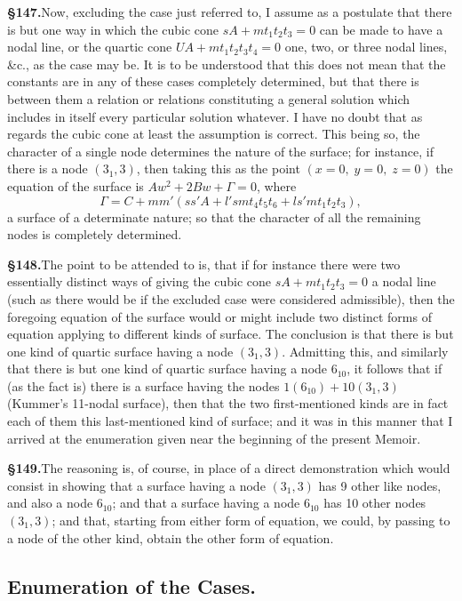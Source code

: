 \documentclass[11pt,a4paper]{article}
\begin{document}
\textbf{\S 147.}\quad Now, excluding the case just referred to, I assume as a postulate that there is but one way in which the cubic cone $sA + mt_1t_2t_3 = 0$ can be made to have a nodal line, or the quartic cone $UA + mt_1t_2t_3t_4 = 0$ one, two, or three nodal lines, \&c., as the case may be. It is to be understood that this does not mean that the constants are in any of these cases completely determined, but that there is between them a relation or relations constituting a general solution which includes in itself every particular solution whatever. I have no doubt that as regards the cubic cone at least the assumption is correct. This being so, the character of a single node determines the nature of the surface; for instance, if there is a node $(3_1, 3)$, then taking this as the point $(x = 0,\; y = 0,\; z = 0)$ the equation of the surface is $Aw^2 + 2Bw + \Gamma = 0$, where
\[
\Gamma = C + mm'(ss'A + l'smt_4t_5t_6 + ls'mt_1t_2t_3),
\]
a surface of a determinate nature; so that the character of all the remaining nodes is completely determined.

\textbf{\S 148.}\quad The point to be attended to is, that if for instance there were two essentially distinct ways of giving the cubic cone $sA + mt_1t_2t_3 = 0$ a nodal line (such as there would be if the excluded case were considered admissible), then the foregoing equation of the surface would or might include two distinct forms of equation applying to different kinds of surface. The conclusion is that there is but one kind of quartic surface having a node $(3_1, 3)$. Admitting this, and similarly that there is but one kind of quartic surface having a node $6_{10}$, it follows that if (as the fact is) there is a surface having the nodes $1(6_{10}) + 10(3_1, 3)$ (Kummer's 11-nodal surface), then that the two first-mentioned kinds are in fact each of them this last-mentioned kind of surface; and it was in this manner that I arrived at the enumeration given near the beginning of the present Memoir.

\textbf{\S 149.}\quad The reasoning is, of course, in place of a direct demonstration which would consist in showing that a surface having a node $(3_1, 3)$ has 9 other like nodes, and also a node $6_{10}$; and that a surface having a node $6_{10}$ has 10 other nodes $(3_1, 3)$; and that, starting from either form of equation, we could, by passing to a node of the other kind, obtain the other form of equation.

\subsection*{Enumeration of the Cases.}
\end{document}
